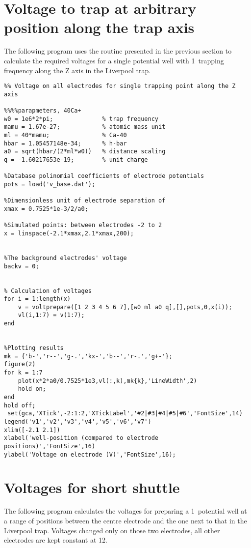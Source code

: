 \section{Voltage to trap at arbitrary position along the trap axis}

The following program uses the routine presented in the previous section to calculate the required voltages for a single potential well with 1\MHz\, trapping frequency along the Z axis in the Liverpool trap. 

\begin{mylisting}
\begin{verbatim}
%% Voltage on all electrodes for single trapping point along the Z axis

%%%%parapmeters, 40Ca+
w0 = 1e6*2*pi;              % trap frequency
mamu = 1.67e-27;            % atomic mass unit
ml = 40*mamu;               % Ca-40
hbar = 1.05457148e-34;      % h-bar
a0 = sqrt(hbar/(2*ml*w0))   % distance scaling
q = -1.60217653e-19;        % unit charge

%Database polinomial coefficients of electrode potentials
pots = load('v_base.dat');

%Dimensionless unit of electrode separation of
xmax = 0.7525*1e-3/2/a0;

%Simulated points: between electrodes -2 to 2
x = linspace(-2.1*xmax,2.1*xmax,200);


%The background electrodes' voltage
backv = 0;


% Calculation of voltages
for i = 1:length(x)
    v = voltprepare([1 2 3 4 5 6 7],[w0 ml a0 q],[],pots,0,x(i));
    vl(i,1:7) = v(1:7);
end


%Plotting results
mk = {'b-','r--','g-.','kx-','b--','r-.','g+-'};
figure(2)
for k = 1:7
    plot(x*2*a0/0.7525*1e3,vl(:,k),mk{k},'LineWidth',2)
    hold on;
end
hold off;
 set(gca,'XTick',-2:1:2,'XTickLabel','#2|#3|#4|#5|#6','FontSize',14)
legend('v1','v2','v3','v4','v5','v6','v7')
xlim([-2.1 2.1])
xlabel('well-position (compared to electrode positions)','FontSize',16)
ylabel('Voltage on electrode (V)','FontSize',16);
\end{verbatim}
\end{mylisting}

\section{Voltages for short shuttle}

The following program calculates the voltages for preparing a 1\MHz\, potential well at a range of positions between the centre electrode and the one next to that in the Liverpool trap. Voltages changed only on those two electrodes, all other electrodes are kept constant at 12\V. 

